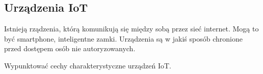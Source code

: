 \subsection{Urządzenia IoT}

Istnieją rządzenia, którą komunikują się między sobą przez sieć internet. Mogą to być smartphone,
inteligentne zamki. Urządzenia są w jakiś sposób chronione przed dostępem osób nie autoryzowanych.

Wypunktować cechy charakterystyczne urządzeń IoT.
